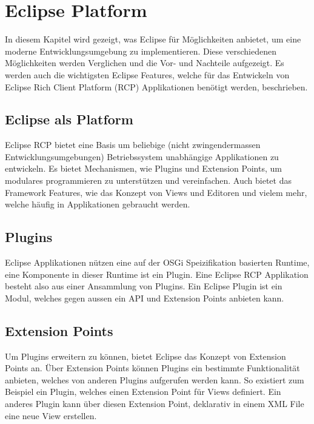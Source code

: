 \chapter{Eclipse Platform}
\label{sec:EclipsePlatform}

In diesem Kapitel wird gezeigt, was Eclipse für Möglichkeiten anbietet, um eine moderne Entwicklungsumgebung zu implementieren. Diese verschiedenen Möglichkeiten werden Verglichen und die Vor- und Nachteile aufgezeigt. Es werden auch die wichtigsten Eclipse Features, welche für das Entwickeln von Eclipse Rich Client Platform (RCP) Applikationen benötigt werden, beschrieben.

\section{Eclipse als Platform}

Eclipse RCP bietet eine Basis um beliebige (nicht zwingendermassen Entwicklungsumgebungen) Betriebssystem unabhängige Applikationen zu entwickeln. Es bietet Mechanismen, wie Plugins und Extension Points, um modulares programmieren zu unterstützen und vereinfachen. Auch bietet das Framework Features, wie das Konzept von Views und Editoren und vielem mehr, welche häufig in Applikationen gebraucht werden.

\section{Plugins}

Eclipse Applikationen nützen eine auf der OSGi Speizifikation basierten Runtime, eine Komponente in dieser Runtime ist ein Plugin. Eine Eclipse RCP Applikation besteht also aus einer Ansammlung von Plugins. Ein Eclipse Plugin ist ein Modul, welches gegen aussen ein API und Extension Points anbieten kann. 

\section{Extension Points}

Um Plugins erweitern zu können, bietet Eclipse das Konzept von Extension Points an. Über Extension Points können Plugins ein bestimmte Funktionalität anbieten, welches von anderen Plugins aufgerufen werden kann. 
\newline
So existiert zum Beispiel ein Plugin, welches einen Extension Point für Views definiert. Ein anderes Plugin kann über diesen Extension Point, deklarativ in einem XML File eine neue View erstellen. \cite{extensionpoints}

